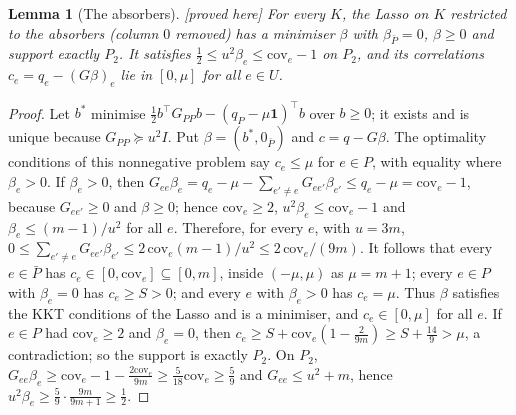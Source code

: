 \documentclass[10pt,a4paper]{article}
\theoremstyle{plain}
\newtheorem{lemma}[theorem]{Lemma}
\theoremstyle{definition}
\theoremstyle{remark}
\newcommand{\status}[1]{\textnormal{\textsf{\small [#1]}}}
\begin{document}
\begin{lemma}[The absorbers]\label{lem:absorb}\status{proved here}
For every $K$, the Lasso on $K$ restricted to the absorbers (column $0$ removed) has a minimiser $\beta$ with $\beta_{\bar P}=0$, $\beta\ge0$ and support exactly $P_2$. It satisfies $\frac12\le u^2\beta_e\le\mathrm{cov}_e-1$ on $P_2$, and its correlations $c_e=q_e-(G\beta)_e$ lie in $[0,\mu]$ for all $e\in U$.
\end{lemma}
\begin{proof}
Let $b^\ast$ minimise $\frac12b^{\top}G_{PP}b-(q_P-\mu\mathbf 1)^{\top}b$ over $b\ge0$; it exists and is unique because $G_{PP}\succeq u^2I$. Put $\beta=(b^\ast,0_{\bar P})$ and $c=q-G\beta$. The optimality conditions of this nonnegative problem say $c_e\le\mu$ for $e\in P$, with equality where $\beta_e>0$. If $\beta_e>0$, then $G_{ee}\beta_e=q_e-\mu-\sum_{e'\ne e}G_{ee'}\beta_{e'}\le q_e-\mu=\mathrm{cov}_e-1$, because $G_{ee'}\ge0$ and $\beta\ge0$; hence $\mathrm{cov}_e\ge2$, $u^2\beta_e\le\mathrm{cov}_e-1$ and $\beta_e\le(m-1)/u^2$ for all $e$. Therefore, for every $e$, with $u=3m$, $0\le\sum_{e'\ne e}G_{ee'}\beta_{e'}\le 2\,\mathrm{cov}_e(m-1)/u^2\le 2\,\mathrm{cov}_e/(9m)$. It follows that every $e\in\bar P$ has $c_e\in[0,\mathrm{cov}_e]\subseteq[0,m]$, inside $(-\mu,\mu)$ as $\mu=m+1$; every $e\in P$ with $\beta_e=0$ has $c_e\ge S>0$; and every $e$ with $\beta_e>0$ has $c_e=\mu$. Thus $\beta$ satisfies the KKT conditions of the Lasso and is a minimiser, and $c_e\in[0,\mu]$ for all $e$. If $e\in P$ had $\mathrm{cov}_e\ge2$ and $\beta_e=0$, then $c_e\ge S+\mathrm{cov}_e(1-\frac2{9m})\ge S+\frac{14}9>\mu$, a contradiction; so the support is exactly $P_2$. On $P_2$, $G_{ee}\beta_e\ge\mathrm{cov}_e-1-\frac{2\mathrm{cov}_e}{9m}\ge\frac5{18}\mathrm{cov}_e\ge\frac59$ and $G_{ee}\le u^2+m$, hence $u^2\beta_e\ge\frac59\cdot\frac{9m}{9m+1}\ge\frac12$.
\end{proof}
\end{document}
